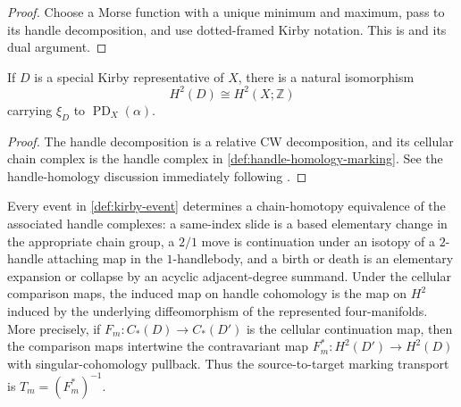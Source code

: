 \begin{proof}
Choose a Morse function with a unique minimum and maximum, pass to its handle
decomposition, and use dotted-framed Kirby notation.  This is
\cite[Proposition~4.2.13]{GompfStipsicz1999} and its dual argument.
\end{proof}

\begin{proposition}
\label{prop:handle-homology-realization}
If $D$ is a special Kirby representative of $X$, there is a natural
isomorphism
\[
  H^2(D)\cong H^2(X;\mathbb Z)
\]
carrying $\xi_D$ to $\operatorname{PD}_X(\alpha)$.
\end{proposition}

\begin{proof}
The handle decomposition is a relative CW decomposition, and its cellular
chain complex is the handle complex in
\cref{def:handle-homology-marking}.  See the handle-homology discussion
immediately following \cite[Proposition~4.2.13]{GompfStipsicz1999}.
\end{proof}

\begin{lemma}
\label{lem:marked-handle-complex-naturality}
Every event in \cref{def:kirby-event} determines a chain-homotopy
equivalence of the associated handle complexes: a same-index slide is a based
elementary change in the appropriate chain group, a $2/1$ move is continuation
under an isotopy of a $2$-handle attaching map in the $1$-handlebody, and a
birth or death is an elementary expansion or collapse by an acyclic
adjacent-degree summand.  Under the
cellular comparison maps, the induced map on handle cohomology is the map on
$H^2$ induced by the underlying diffeomorphism of the represented
four-manifolds.  More precisely, if
$F_m\colon C_*(D)\to C_*(D')$ is the cellular continuation map, then the
comparison maps intertwine the contravariant map
$F_m^*\colon H^2(D')\to H^2(D)$ with singular-cohomology pullback.  Thus the
source-to-target marking transport is $T_m=(F_m^*)^{-1}$.
\end{lemma}

